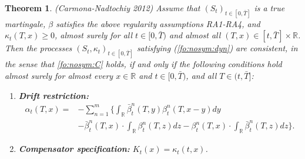 \documentclass{article}
\numberwithin{equation}{section}
\newtheorem{theorem}{Theorem}
\newcommand\RR {\mathbb R}
\def\bT{\bar{T}}
\def\bbeta{\bar{\beta}}
\begin{document}
\begin{theorem}\label{theo:nosym:conditions}
(Carmona-Nadtochiy 2012) Assume that $\left(S_t\right)_{t\in[0,\bT]}$ is a true martingale, $\beta$ satisfies the above regularity assumptions RA1-RA4, and $\kappa_t(T,x)\geq0$, almost surely for all $t\in[0,\bT)$ and almost all $(T,x)\in[t,\bT]\times\RR$.
Then the processes $\left(S_t,\kappa_t\right)_{t\in[0,\bT]}$ satisfying (\ref{fo:nosym:dyn}) are \emph{consistent}, in the sense that \eqref{fo:nosym:C} holds, if and only if the following conditions hold almost surely for almost every
$x\in\RR$ and $t\in[0,\bT)$, and all $T\in(t,\bT]$:

\begin{enumerate}
\item \textbf{Drift restriction:}
\begin{align} \label{fo:implementation:driftcondition}
\alpha_t(T,x) = & - \sum_{n=1}^m \bigg\{\int_\RR \bbeta^n_t(T,y) \beta^n_t(T,x-y) dy \nonumber \\
& -  \bbeta^n_t(T,x) \cdot \int_\RR \beta^n_t(T,z)dz  - \beta^n_t(T,x) \cdot \int_\RR \bbeta^n_t(T,z)dz\bigg\}. 
\end{align}

\item \textbf{Compensator specification:} $K_t(x) = \kappa_t(t,x)$.
\end{enumerate}
\end{theorem}
\end{document}
